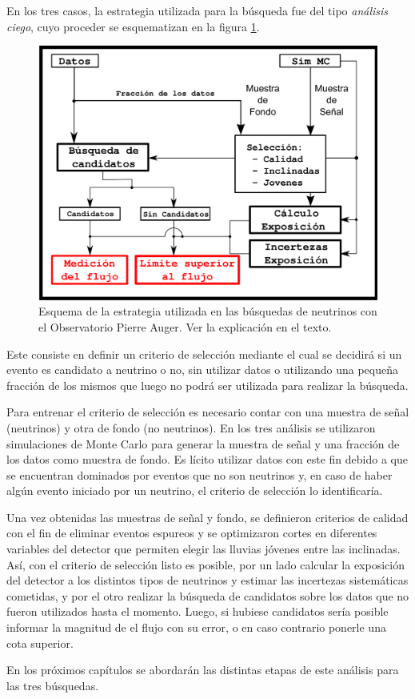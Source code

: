 En los tres casos, la estrategia utilizada para la búsqueda fue del tipo \emph{análisis ciego}, cuyo proceder se esquematizan en la figura \ref{fig:strAuger}.
%
\begin{figure}[ht!]
	\centering
	\includegraphics[width=\textwidth]{./fig/estrategiaAuger/analysisSchema}
	\caption{\label{fig:strAuger}
	Esquema de la estrategia utilizada en las búsquedas de neutrinos con el Observatorio Pierre Auger. Ver la explicación en el texto.
	}
\end{figure}
%
Este consiste en definir un criterio de selección mediante el cual se decidirá si un evento es candidato a neutrino o no, sin utilizar datos o utilizando una pequeña fracción de los mismos que luego no podrá ser utilizada para realizar la búsqueda.

Para entrenar el criterio de selección es necesario contar con una muestra de señal (neutrinos) y otra de fondo (no neutrinos).
En los tres análisis se utilizaron simulaciones de Monte Carlo para generar la muestra de señal y una fracción de los datos como muestra de fondo.
Es lícito utilizar datos con este fin debido a que se encuentran dominados por eventos que no son neutrinos y, en caso de haber algún evento iniciado por un neutrino, el criterio de selección lo identificaría.

Una vez obtenidas las muestras de señal y fondo, se definieron criterios de calidad con el fin de eliminar eventos espureos y se optimizaron cortes en diferentes variables del detector que permiten elegir las lluvias jóvenes entre las inclinadas.
Así, con el criterio de selección listo es posible, por un lado calcular la exposición del detector a los distintos tipos de neutrinos y estimar las incertezas sistemáticas cometidas, y por el otro realizar la búsqueda de candidatos sobre los datos que no fueron utilizados hasta el momento.
Luego, si hubiese candidatos sería posible informar la magnitud de el flujo con su error, o en caso contrario ponerle una cota superior.

En los próximos capítulos se abordarán las distintas etapas de este análisis para las tres búsquedas.

